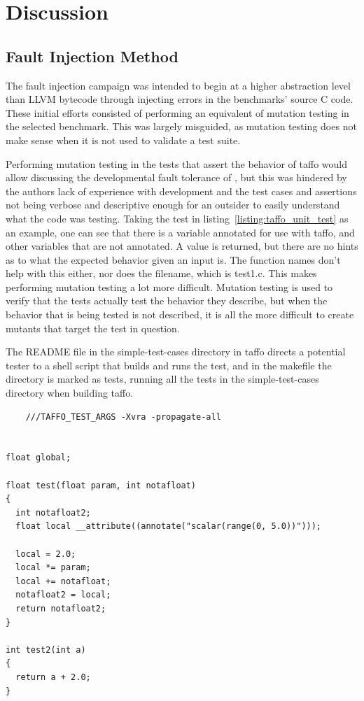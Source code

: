 \section{Discussion}

\subsection{Fault Injection Method}

The fault injection campaign was intended to begin at a higher abstraction level than LLVM bytecode through injecting errors in the benchmarks' source C code. These initial efforts consisted of performing an equivalent of mutation testing in the selected benchmark. This was largely misguided, as mutation testing does not make sense when it is not used to validate a test suite. 

Performing mutation testing in the tests that assert the behavior of taffo would allow discussing the developmental fault tolerance of \taffo{}, but this was hindered by the authors lack of experience with \taffo{} development and the test cases and assertions not being verbose and descriptive enough for an outsider to easily understand what the code was testing. Taking the test in listing~\ref{listing:taffo_unit_test} as an example, one can see that there is a variable annotated for use with taffo, and other variables that are not annotated. A value is returned, but there are no hints as to what the expected behavior given an input is. The function names don't help with this either, nor does the filename, which is test1.c. This makes performing mutation testing a lot more difficult. Mutation testing is used to verify that the tests actually test the behavior they describe, but when the behavior that is being tested is not described, it is all the more difficult to create mutants that target the test in question.

The README file in the simple-test-cases directory in taffo directs a potential tester to a shell script that builds and runs the test, and in the makefile the directory is marked as tests, running all the tests in the simple-test-cases directory when building taffo.

\begin{lstlisting}
    ///TAFFO_TEST_ARGS -Xvra -propagate-all


float global;

float test(float param, int notafloat)
{
  int notafloat2;
  float local __attribute((annotate("scalar(range(0, 5.0))")));
  
  local = 2.0;
  local *= param;
  local += notafloat;
  notafloat2 = local;
  return notafloat2;
}

int test2(int a)
{
  return a + 2.0;
}

\end{lstlisting}

